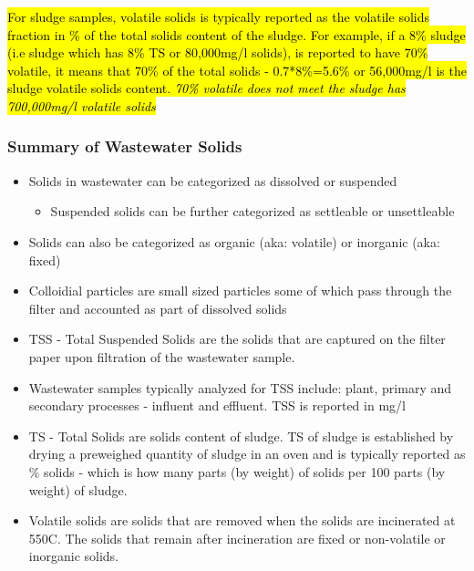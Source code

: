 							
				
				
					\hl{For sludge samples, volatile solids is typically reported as the volatile solids fraction in \% of the total solids content of the sludge.  For example, if a 8\% sludge (i.e sludge which has 8\% TS or 80,000mg/l solids), is reported to have 70\% volatile, it means that 70\% of the total solids - 0.7*8\%=5.6\% or 56,000mg/l is the sludge volatile solids content.  \emph{70\% volatile does not meet the sludge has 700,000mg/l volatile solids}}\\
				
	\subsubsection{Summary of Wastewater Solids}		
			\begin{itemize}
				\item Solids in wastewater can be categorized as dissolved or suspended
				      \begin{itemize}
				      	\item Suspended solids can be further categorized as settleable or unsettleable
				      \end{itemize}
				\item Solids can also be categorized as organic (aka: volatile) or inorganic (aka: fixed)
				\item Colloidial particles are small sized particles some of which pass through the filter and accounted as part of dissolved solids
				\item TSS - Total Suspended Solids are the solids that are captured on the filter paper upon filtration of the wastewater sample.  
				\item Wastewater samples typically analyzed for TSS include:  plant, primary and secondary processes - influent and effluent.  TSS is reported in mg/l
				\item TS - Total Solids are solids content of sludge.  TS of sludge is established by drying a preweighed quantity of sludge in an oven and is typically reported as \% solids - which is how many parts (by weight) of solids per 100 parts (by weight) of sludge.
				\item Volatile solids are solids that are removed when the solids are incinerated at 550C.  The solids that remain after incineration are fixed or non-volatile or inorganic solids.
			\end{itemize}

